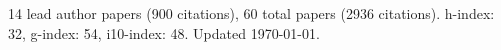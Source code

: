 14 lead author papers (900 citations),
60 total papers (2936 citations).\newline
h-index: 32, g-index: 54, i10-index: 48. Updated \today.